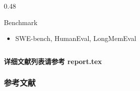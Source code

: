 \documentclass[aspectratio=169,10pt]{beamer}
\begin{document}
\begin{frame}
\begin{columns}[T]
\begin{column}{0.48\textwidth}
      \vspace{0.15cm}

      \begin{block}{Benchmark}
        \footnotesize
        \begin{itemize}
          \item SWE-bench, HumanEval, LongMemEval
        \end{itemize}
      \end{block}
    \end{column}
  \end{columns}

  \vspace{0.3cm}

  \begin{center}
    \textbf{详细文献列表请参考 report.tex}
  \end{center}
\end{frame}

\begin{frame}[allowframebreaks]
  \frametitle{参考文献}
  \printbibliography
\end{frame}
\end{document}
